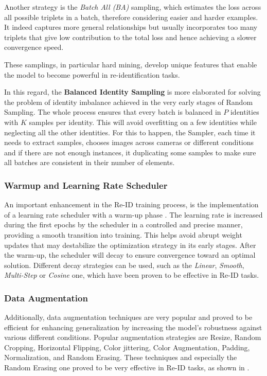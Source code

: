 Another strategy is the \textit{Batch All (BA)} sampling, which estimates the loss across all possible triplets in a batch, therefore considering easier and harder examples. It indeed captures more general relationships but usually incorporates too many triplets that give low contribution to the total loss and hence achieving a slower convergence speed.

These samplings, in particular hard mining, develop unique features that enable the model to become powerful in re-identification tasks.

In this regard, the \textbf{Balanced Identity Sampling} is more elaborated for solving the problem of identity imbalance achieved in the very early stages of Random Sampling. The whole process ensures that every batch is balanced in $P$ identities with $K$ samples per identity. This will avoid overfitting on a few identities while neglecting all the other identities. For this to happen, the Sampler, each time it needs to extract samples, chooses images across cameras or different conditions and if there are not enough instances, it duplicating some samples to make sure all batches are consistent in their number of elements.

\subsubsection{Warmup and Learning Rate Scheduler}
\label{subsubsec:WarmupScheduler}
An important enhancement in the Re-ID training process, is the implementation of a learning rate scheduler with a warm-up phase \cite{BagOfTricks}. The learning rate is increased during the first epochs by the scheduler in a controlled and precise manner, providing a smooth transition into training. This helps avoid abrupt weight updates that may destabilize the optimization strategy in its early stages. After the warm-up, the scheduler will decay to ensure convergence toward an optimal solution. Different decay strategies can be used, such as the \textit{Linear}, \textit{Smooth}, \textit{Multi-Step} or \textit{Cosine} one, which have been proven to be effective in Re-ID tasks.

\subsubsection{Data Augmentation}
Additionally, data augmentation techniques are very popular and proved to be efficient for enhancing generalization by increasing the model's robustness against various different conditions. Popular augmentation strategies are Resize, Random Cropping, Horizontal Flipping, Color jittering, Color Augmentation, Padding, Normalization, and Random Erasing. These techniques and especially the Random Erasing one proved to be very effective in Re-ID tasks, as shown in \cite{BagOfTricks, RandomErasing}.

